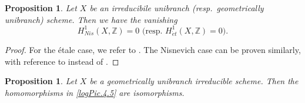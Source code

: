 \documentclass[11pt, a4paper]{amsart}
\newtheorem{prop}[thm]{Proposition}
\theoremstyle{definition}
\numberwithin{equation}{subsection}
\newcommand{\Z}{\mathbb{Z}}
\newcommand{\et}{{\acute{e}t}}
\begin{document}
\begin{prop}
\label{logPic.9}
Let $X$ be an irreducibile unibranch (resp.\ geometrically unibranch) scheme.
Then we have the vanishing
\[
H_{Nis}^1(X,\Z)=0
\text{ (resp.\ }
H_{\et}^1(X,\Z)=0
\text{)}.
\]
\end{prop}
\begin{proof}
For the \'etale case, we refer to \cite[Proposition IX.3.6(2)]{SGA4}.
The Nisnevich case can be proven similarly, 
with reference to \cite[Proposition IV.18.12.6]{EGA} instead of \cite[Proposition IV.18.14.15]{EGA}.
\end{proof}


\begin{prop}
\label{logPic.3}
Let $X$ be a geometrically unibranch irreducible scheme.
Then the homomorphisms in \eqref{logPic.4.5} are isomorphisms.
\end{prop}
\end{document}
